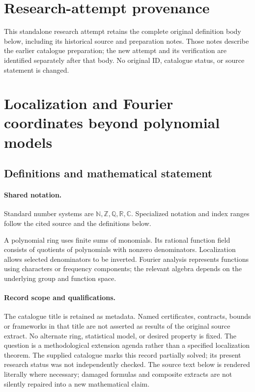 \documentclass[11pt]{article}
\begin{document}
\section*{Research-attempt provenance}
This standalone research attempt retains the complete original definition body below,
including its historical source and preparation notes. Those notes describe the
earlier catalogue preparation; the new attempt and its verification are identified
separately after that body. No original ID, catalogue status, or source statement is changed.

\section{Localization and Fourier coordinates beyond polynomial models}\label{statement}

\subsection{Definitions and mathematical statement}

\paragraph{Shared notation.}Standard number systems are $\mathbb N,\mathbb Z,\mathbb Q,\mathbb R,\mathbb C$. Specialized notation and index ranges follow the cited source and the definitions below.


A polynomial ring uses finite sums of monomials. Its rational function field consists of quotients of polynomials with nonzero denominators. Localization allows selected denominators to be inverted. Fourier analysis represents functions using characters or frequency components; the relevant algebra depends on the underlying group and function space.
\paragraph{Record scope and qualifications.}
The catalogue title is retained as metadata. Named certificates, contracts, bounds or frameworks in that title are not asserted as results of the original source extract.
No alternate ring, statistical model, or desired property is fixed. The question is a methodological extension agenda rather than a specified localization theorem. The supplied catalogue marks this record partially solved; its present research status was not independently checked.
The source text below is rendered literally where necessary; damaged formulas and composite extracts are not silently repaired into a new mathematical claim.
\end{document}
